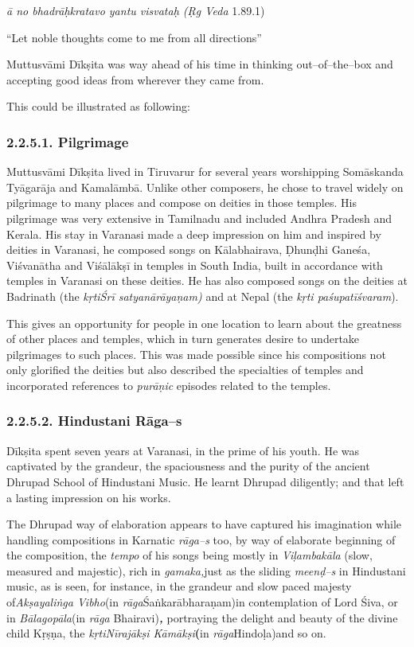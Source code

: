 \textit{ā no bhadrāḥkratavo yantu visvataḥ (Ṛg Veda} 1.89.1)

“Let noble thoughts come to me from all directions”

Muttusvāmi Dīkṣita was way ahead of his time in thinking out–of–the–box and accepting good ideas from wherever they came from.

This could be illustrated as following:

\subsubsection*{2.2.5.1. Pilgrimage}

Muttusvāmi Dīkṣita lived in Tiruvarur for several years worshipping Somāskanda Tyāgarāja and Kamalāmbā. Unlike other composers, he chose to travel widely on pilgrimage to many places and compose on deities in those temples. His pilgrimage was very extensive in Tamilnadu and included Andhra Pradesh and Kerala. His stay in Varanasi made a deep impression on him and inspired by deities in Varanasi, he composed songs on Kālabhairava, Ḍhunḍhi Ganeśa, Viśvanātha and Viśālākṣī in temples in South India, built in accordance with temples in Varanasi on these deities. He has also composed songs on the deities at Badrinath (the \textit{kṛtiŚrī satyanārāyaṇam)} and at Nepal (the\textit{ kṛti paśupatīśvaram}).

This gives an opportunity for people in one location to learn about the greatness of other places and temples, which in turn generates desire to undertake pilgrimages to such places. This was made possible since his compositions not only glorified the deities but also described the specialties of temples and incorporated references to \textit{purāṇic} episodes related to the temples.


\subsubsection*{2.2.5.2. Hindustani Rāga–s}

Dīkṣita spent seven years at Varanasi, in the prime of his youth. He was captivated by the grandeur, the spaciousness and the purity of the ancient Dhrupad School of Hindustani Music. He learnt Dhrupad diligently; and that left a lasting impression on his works.

The Dhrupad way of elaboration appears to have captured his imagination while handling compositions in Karnatic \textit{rāga–s} too, by way of elaborate beginning of the composition, the \textit{tempo} of his songs being mostly in \textit{Viḷambakāla} (slow, measured and majestic), rich in \textit{gamaka,}just as the sliding \textit{meenḍ–s} in Hindustani music, as is seen, for instance, in the grandeur and slow paced majesty of\textit{Akṣayaliṅga Vibho}(in \textit{rāga}Śaṅkarābharaṇam)in contemplation of Lord Śiva, or in \textit{Bālagopāla}(in \textit{rāga} Bhairavi)\textit{\textbf{, }}portraying the delight and beauty of the divine child Kṛṣṇa, the \textit{kṛtiNīrajākṣi Kāmākṣi}\textbf{(}in \textit{rāga}Hindoḷa)and so on.

